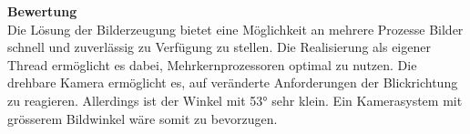 \textbf{Bewertung}\\[0.2cm]
Die Lösung der Bilderzeugung bietet eine Möglichkeit an mehrere Prozesse Bilder schnell und zuverlässig zu Verfügung zu stellen. Die Realisierung als eigener Thread ermöglicht es dabei, Mehrkernprozessoren optimal zu nutzen. Die drehbare Kamera ermöglicht es, auf veränderte Anforderungen der Blickrichtung zu reagieren. Allerdings ist der Winkel mit 53° sehr klein. Ein Kamerasystem mit grösserem Bildwinkel wäre somit zu bevorzugen.
